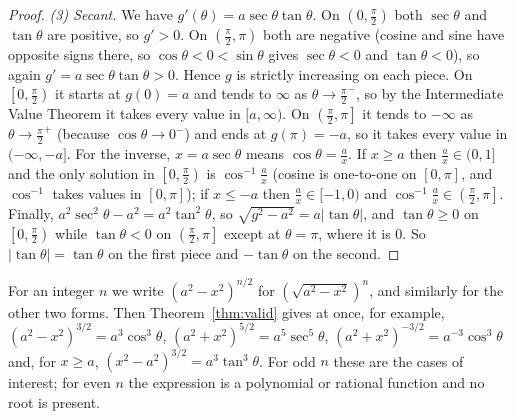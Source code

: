 \documentclass[11pt]{article}
\begin{document}
\begin{proof}
\emph{(3) Secant.} We have $g'(\theta)=a\sec\theta\tan\theta$. On $\left(0,\frac\pi2\right)$ both $\sec\theta$ and $\tan\theta$ are positive, so $g'>0$. On $\left(\frac\pi2,\pi\right)$ both are negative (cosine and sine have opposite signs there, so $\cos\theta<0<\sin\theta$ gives $\sec\theta<0$ and $\tan\theta<0$), so again $g'=a\sec\theta\tan\theta>0$. Hence $g$ is strictly increasing on each piece. On $\left[0,\frac\pi2\right)$ it starts at $g(0)=a$ and tends to $\infty$ as $\theta\to\frac\pi2^-$, so by the Intermediate Value Theorem it takes every value in $[a,\infty)$. On $\left(\frac\pi2,\pi\right]$ it tends to $-\infty$ as $\theta\to\frac\pi2^+$ (because $\cos\theta\to0^-$) and ends at $g(\pi)=-a$, so it takes every value in $(-\infty,-a]$. For the inverse, $x=a\sec\theta$ means $\cos\theta=\frac ax$. If $x\ge a$ then $\frac ax\in(0,1]$ and the only solution in $\left[0,\frac\pi2\right)$ is $\cos^{-1}\frac ax$ (cosine is one-to-one on $[0,\pi]$, and $\cos^{-1}$ takes values in $[0,\pi]$); if $x\le-a$ then $\frac ax\in[-1,0)$ and $\cos^{-1}\frac ax\in\left(\frac\pi2,\pi\right]$. Finally, $a^2\sec^2\theta-a^2=a^2\tan^2\theta$, so $\sqrt{g^2-a^2}=a\lvert\tan\theta\rvert$, and $\tan\theta\ge0$ on $\left[0,\frac\pi2\right)$ while $\tan\theta<0$ on $\left(\frac\pi2,\pi\right]$ except at $\theta=\pi$, where it is $0$. So $\lvert\tan\theta\rvert=\tan\theta$ on the first piece and $-\tan\theta$ on the second.
\end{proof}

\begin{remark}
For an integer $n$ we write $(a^2-x^2)^{n/2}$ for $\left(\sqrt{a^2-x^2}\right)^n$, and similarly for the other two forms. Then Theorem~\ref{thm:valid} gives at once, for example, $(a^2-x^2)^{3/2}=a^3\cos^3\theta$, $(a^2+x^2)^{5/2}=a^5\sec^5\theta$, $(a^2+x^2)^{-3/2}=a^{-3}\cos^3\theta$ and, for $x\ge a$, $(x^2-a^2)^{3/2}=a^3\tan^3\theta$. For odd $n$ these are the cases of interest; for even $n$ the expression is a polynomial or rational function and no root is present.
\end{remark}
\end{document}
